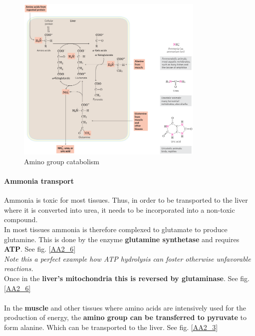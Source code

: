 \documentclass[../main.tex]{subfiles}
\begin{document}
\begin{figure}[H]
	\centering
	\includegraphics[width = 0.8\textwidth]{AA1_2}
	\caption{Amino group catabolism}
	\label{AA1_2}
\end{figure}

\paragraph{Ammonia transport}
Ammonia is toxic for most tissues. Thus, in order to be transported to the liver where it is converted into urea, it needs to be incorporated into a non-toxic compound. \\
\indent In most tissues ammonia is therefore complexed to glutamate to produce glutamine. This is done by the enzyme \textbf{glutamine synthetase} and requires \textbf{ATP}. See fig. \ref{AA2_6} \\
\textit{Note this a perfect example how ATP hydrolysis can foster otherwise unfavorable reactions.}\\
\indent Once in the \textbf{liver's mitochondria this is reversed by glutaminase}. See fig. \ref{AA2_6}\\
\\ 
In the \textbf{muscle} and other tissues where amino acids are intensively used for the production of energy, the \textbf{amino group can be transferred to pyruvate} to form alanine. Which can be transported to the liver. See fig. \ref{AA2_3}
\end{document}
